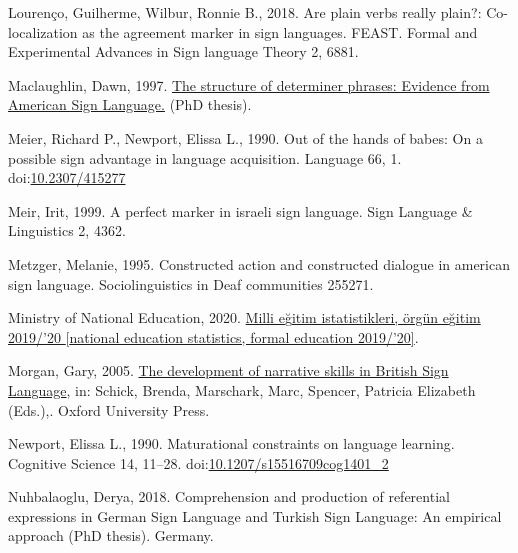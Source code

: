 \documentclass[]{elsarticle} %
\newlength{\cslhangindent}
\newenvironment{CSLReferences}[2] %
 {%
  \setlength{\parindent}{0pt}
  \ifodd #1 \everypar{\setlength{\hangindent}{\cslhangindent}}\ignorespaces\fi
  \ifnum #2 > 0
  \setlength{\parskip}{#2\baselineskip}
  \fi
 }%
 {}
\begin{document}
\begin{CSLReferences}{1}{0}
\leavevmode{}%
Lourenço, Guilherme, Wilbur, Ronnie B., 2018. Are plain verbs really
plain?: Co-localization as the agreement marker in sign languages.
FEAST. Formal and Experimental Advances in Sign language Theory 2, 6881.

\leavevmode{}%
Maclaughlin, Dawn, 1997.
\href{http://lear.unive.it/jspui/handle/11707/7016}{The structure of
determiner phrases: Evidence from American Sign Language.} (PhD thesis).

\leavevmode{}%
Meier, Richard P., Newport, Elissa L., 1990. Out of the hands of babes:
On a possible sign advantage in language acquisition. Language 66, 1.
doi:\href{https://doi.org/10.2307/415277}{10.2307/415277}

\leavevmode{}%
Meir, Irit, 1999. A perfect marker in israeli sign language. Sign
Language \& Linguistics 2, 4362.

\leavevmode{}%
Metzger, Melanie, 1995. Constructed action and constructed dialogue in
american sign language. Sociolinguistics in Deaf communities 255271.

\leavevmode{}%
Ministry of National Education, 2020.
\href{http://sgb.meb.gov.tr/meb_iys_dosyalar/2020_09/04144812_meb_istatistikleri_orgun_\%20egitim_2019_2020.pdf}{Milli
e{ğ}itim istatistikleri, örgün e{ğ}itim 2019/{'}20 {[}national education
statistics, formal education 2019/{'}20{]}}.

\leavevmode{}%
Morgan, Gary, 2005.
\href{http://www.oxfordscholarship.com/view/10.1093/acprof:oso/9780195180947.001.0001/acprof-9780195180947}{The
development of narrative skills in British Sign Language}, in: Schick,
Brenda, Marschark, Marc, Spencer, Patricia Elizabeth (Eds.),. Oxford
University Press.

\leavevmode{}%
Newport, Elissa L., 1990. Maturational constraints on language learning.
Cognitive Science 14, 11--28.
doi:\href{https://doi.org/10.1207/s15516709cog1401_2}{10.1207/s15516709cog1401\_2}

\leavevmode{}%
Nuhbalaoglu, Derya, 2018. Comprehension and production of referential
expressions in German Sign Language and Turkish Sign Language: An
empirical approach (PhD thesis). Germany.


\end{CSLReferences}
\end{document}
